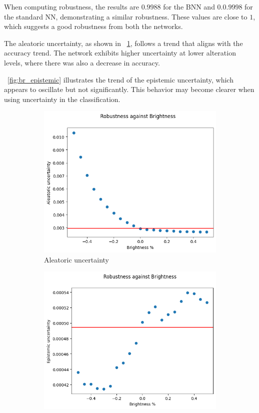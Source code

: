 When computing robustness, the results are $0.9988$ for the BNN and $0.0.9998$ for the standard NN, demonstrating a similar robustness. These values are close to $1$, which suggests a good robustness from both the networks.

The aleatoric uncertainty, as shown in \Fig~\ref{fig:br_aleatoric}, follows a trend that aligns with the accuracy trend. The network exhibits higher uncertainty at lower alteration levels, where there was also a decrease in accuracy. 

\Fig~\ref{fig:br_epistemic} illustrates the trend of the epistemic uncertainty, which appears to oscillate but not significantly. This behavior may become clearer when using uncertainty in the classification.

\begin{figure}[h]
	\centering
	\begin{subfigure}{.5\textwidth}
		\centering
		\includegraphics[width=0.9\linewidth]{ImageFiles/EvalBNN/BR/aleatoric}
		\caption{Aleatoric uncertainty}
		\label{fig:br_aleatoric}
	\end{subfigure}%
	\begin{subfigure}{.5\textwidth}
		\centering
		\includegraphics[width=0.9\linewidth]{ImageFiles/EvalBNN/BR/epistemic}

\end{subfigure}
\end{figure}
